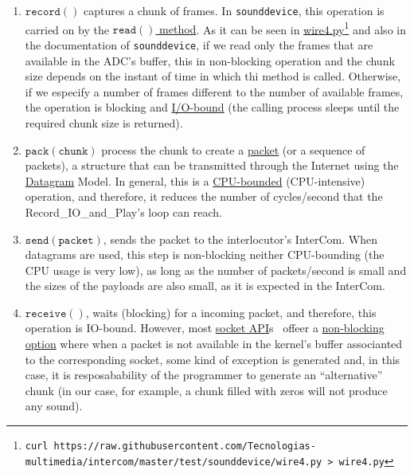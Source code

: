 \begin{enumerate}
\item $\mathtt{record()}$ captures a chunk of frames. In
  \texttt{sounddevice}, this operation is carried on by the
  \href{https://python-sounddevice.readthedocs.io/en/0.4.0/api/streams.html#sounddevice.Stream.read}{$\mathtt{read()}$
    method}. As it can be seen in
  \href{https://raw.githubusercontent.com/Tecnologias-multimedia/intercom/master/test/sounddevice/wire4.py}{wire4.py}\footnote{
  \texttt{curl
    https://raw.githubusercontent.com/Tecnologias-multimedia/intercom/master/test/sounddevice/wire4.py
    > wire4.py}} and also in the documentation of
  \texttt{sounddevice}, if we read only the frames that are available
  in the ADC's buffer, this in non-blocking operation and the chunk
  size depends on the instant of time in which thi method is
  called. Otherwise, if we especify a number of frames different to
  the number of available frames, the operation is blocking and
  \href{https://en.wikipedia.org/wiki/I/O_bound}{I/O-bound} (the
  calling process sleeps until the required chunk size is returned).

\item $\mathtt{pack(chunk)}$ process the chunk to create a
  \href{https://en.wikipedia.org/wiki/Network_packet}{packet} (or a
  sequence of packets), a structure that can be transmitted through
  the Internet using the
  \href{https://en.wikipedia.org/wiki/Datagram}{Datagram} Model. In
  general, this is a
  \href{https://en.wikipedia.org/wiki/CPU-bound}{CPU-bounded}
  (CPU-intensive) operation, and therefore, it reduces the number of
  cycles/second that the Record\_IO\_and\_Play's loop can reach.

\item $\mathtt{send(packet)}$, sends the packet to the interlocutor's
  InterCom. When datagrams are used, this step is non-blocking neither
  CPU-bounding (the CPU usage is very low), as long as the number of
  packets/second is small and the sizes of the payloads are also
  small, as it is expected in the InterCom.

\item $\mathtt{receive()}$, waits (blocking) for a incoming packet,
  and therefore, this operation is IO-bound. However, most
  \href{https://docs.python.org/3/library/socket.html}{socket
    API}s~\cite{python} offeer a
  \href{https://docs.python.org/3.8/library/socket.html#socket.socket.setblocking}{non-blocking
    option} where when a packet is not available in the kernel's
  buffer associanted to the corresponding socket, some kind of
  exception is generated and, in this case, it is resposabability of
  the programmer to generate an ``alternative'' chunk (in our case, for
  example, a chunk filled with zeros will not produce any sound).


\end{enumerate}
